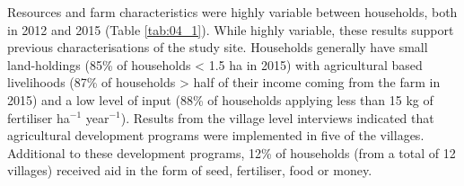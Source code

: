 Resources and farm characteristics were highly variable between households, both in 2012 and 2015 (Table \ref{tab:04_1}). While highly variable, these results support previous characterisations of the study site. Households generally have small land-holdings (85\% of households {\textless} 1.5 ha in 2015) with agricultural based livelihoods (87\% of households {\textgreater} half of their income coming from the farm in 2015) and a low level of input (88\% of households applying less than 15 kg of fertiliser ha$^{-1}$ year$^{-1}$). Results from the village level interviews indicated that agricultural development programs were implemented in five of the villages. Additional to these development programs, 12\% of households (from a total of 12 villages) received aid in the form of seed, fertiliser, food or money.





